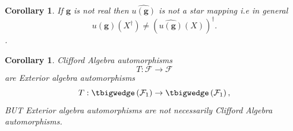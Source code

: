 \documentclass[aps, preprint]{revtex4}
\newtheorem{corollary}[theorem]{Corollary}
\begin{document}
\begin{corollary}
If $\mathbf{g}$ is not real then $\widehat{u \left (\mathbf{g}\right )}$ is not a star mapping i.e in general
\begin{equation}\widehat{u \left (\mathbf{g}\right )} \left (X^{ \dag }\right ) \neq \left (\widehat{u \left (\mathbf{g}\right )} \left (X\right )\right )^{ \dag }\text{.}
\end{equation}. 
\end{corollary}


\begin{corollary}
\emph{Clifford Algebra} automorphisms
\begin{equation}T :\mathcal{F} \rightarrow \mathcal{F}
\end{equation}are Exterior algebra automorphisms
\begin{equation}T : \tbigwedge \left (\mathcal{F}_{1}\right ) \rightarrow  \tbigwedge \left (\mathcal{F}_{1}\right )\text{,}
\end{equation}\emph{BUT }Exterior algebra automorphisms are not necessarily \emph{Clifford Algebra}
automorphisms. 
\end{corollary}
\end{document}
